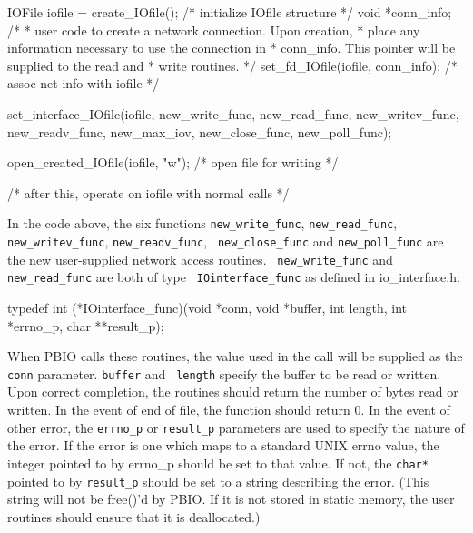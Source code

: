 \begin{Code}
{
    IOFile iofile = create_IOfile();  /* initialize IOfile structure */
    void *conn_info;
    /*
     * user code to create a network connection.  Upon creation,
     * place any information necessary to use the connection in
     * conn_info.  This pointer will be supplied to the read and 
     * write routines.
     */
    set_fd_IOfile(iofile, conn_info);  /* assoc net info with iofile */

    set_interface_IOfile(iofile, new_write_func, new_read_func,
                         new_writev_func, new_readv_func, new_max_iov,
                         new_close_func, new_poll_func);

    open_created_IOfile(iofile, "w");  /* open file for writing */

    /* after this, operate on iofile with normal calls */
}
\end{Code}
\sloppy In the code above, the six functions {\tt new\_write\_func},
{\tt new\_read\_func}, {\tt new\_writev\_func}, {\tt new\_readv\_func}, {\tt
new\_close\_func} and
{\tt new\_poll\_func} are the new user-supplied network access routines.  {\tt
new\_write\_func} and {\tt new\_read\_func} are both of type {\tt
IOinterface\_func} as defined in io\_interface.h:
\begin{Code}
typedef int (*IOinterface_func)(void *conn, void *buffer, int length,
                                int *errno_p, char **result_p);
\end{Code}
When PBIO calls these routines, the value used in the 
call will be supplied as the {\tt conn} parameter.  {\tt buffer} and  {\tt
length} specify the buffer to be read or written.  Upon correct completion,
the routines should return the number of bytes read or written.  In the event
of end of file, the function should return 0.  In the event of other error,
the {\tt errno\_p} or {\tt result\_p} parameters are used to specify the nature
of the error.  If the error is one which maps to a standard UNIX errno value,
the integer pointed to by errno\_p should be set to that value.  If not, the
{\tt char*} pointed to by {\tt result\_p} should be set to a string describing
the error.  (This string will not be free()'d by PBIO.  If it is not stored
in static memory, the user routines should ensure that it is deallocated.)

